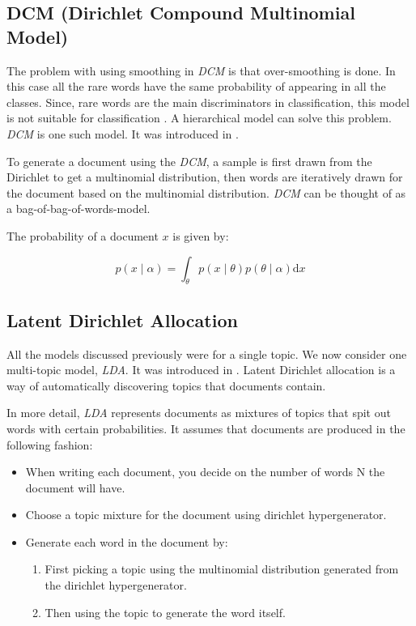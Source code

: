 \subsection{DCM (Dirichlet Compound Multinomial Model)}

The problem with using smoothing in \textit{DCM} is that over-smoothing is done. In this case all the rare words have the same probability
of appearing in all the classes. Since, rare words are the main discriminators in classification, this model is not suitable for
classification \citep*{madsen2005modeling}. A hierarchical model can solve this problem. \textit{DCM} is one such model. It was introduced in \citep*{madsen2005modeling}.

To generate a document using the \textit{DCM}, a sample is first drawn from the Dirichlet to get a multinomial distribution, then words are
iteratively drawn for the document based on the multinomial distribution. \textit{DCM} can be thought of as a bag-of-bag-of-words-model.
\citep*{madsen2005modeling}


The probability of a document \(x\) is given by:

\begin{equation}
 p(x \mid \alpha) = \int_\theta p(x \mid \theta ) p(\theta \mid \alpha) \mathrm{d}x 
\end{equation}

\subsection{Latent Dirichlet Allocation}

All the models discussed previously were for a single topic. We now consider one multi-topic model, \textit{LDA}. It was introduced in 
\citep*{blei2003latent}. Latent Dirichlet allocation is a way of automatically discovering topics that documents contain. 

In more detail, \textit{LDA} represents documents as mixtures of topics that spit out words with certain probabilities. It assumes that 
documents are produced in the following fashion: 

\begin{itemize}

\item When writing each document, you decide on the number of words N the document will have.

\item Choose a topic mixture for the document using dirichlet hypergenerator.

\item Generate each word in the document by:
  
  \begin{enumerate}
  
  \item First picking a topic using the multinomial distribution generated from the dirichlet hypergenerator.
  
  \item Then using the topic to generate the word itself.

  \end{enumerate}

\end{itemize}

